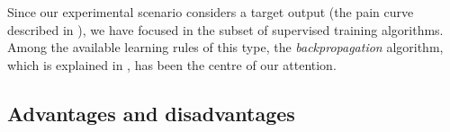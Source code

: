 Since our experimental scenario considers a target output (the pain curve described in ), we have focused in the subset of supervised training algorithms. 
Among the available learning rules of this type, the \emph{backpropagation} algorithm, which is explained in , has been the centre of our attention. 

\subsection{Advantages and disadvantages}




